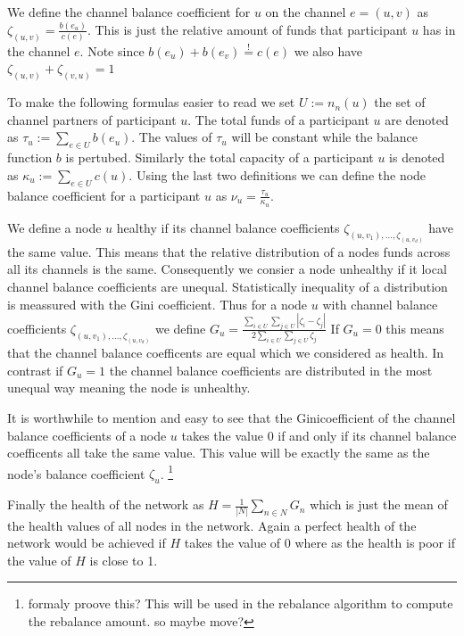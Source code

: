 \documentclass[a4paper]{paper}
\begin{document}
We define the channel balance coefficient for $u$ on the channel $e=(u,v)$ as  $\zeta_{(u,v)} = \frac{b(e_u)}{c(e)}$.
This is just the relative amount of funds that participant $u$ has in the channel $e$.
Note since $b(e_u)+b(e_v)\stackrel{!}{=}c(e)$ we also have $\zeta_{(u,v)} + \zeta_{(v,u)}=1$

To make the following formulas easier to read we set $U:=n_n(u)$ the set of channel partners of participant $u$.
The total funds of a participant $u$ are denoted as $\tau_u:=\displaystyle{\sum_{e\in U}b(e_u)}$.
The values of $\tau_u$ will be constant while the balance function $b$ is pertubed.
Similarly the total capacity of a participant $u$ is denoted as $\kappa_u:=\displaystyle{\sum_{e\in U}c(u)}$.
Using the last two definitions we can define the node balance coefficient for a participant $u$ as $\nu_u = \frac{\tau_u}{\kappa_u}$.

We define a node $u$ healthy if its channel balance coefficients $\zeta_{(u,v_1),\dots,\zeta_{(u,v_d)}}$ have the same value.
This means that the relative distribution of a nodes funds across all its channels is the same.
Consequently we consier a node unhealthy if it local channel balance coefficients are unequal.
Statistically inequality of a distribution is meassured with the Gini coefficient.
Thus for a node $u$ with channel balance coefficients $\zeta_{(u,v_1),\dots,\zeta_{(u,v_d)}}$ we define $G_u = \frac{\displaystyle{\sum_{i\in U} \sum_{j \in U}} | \zeta_i - \zeta_j |}{2 \displaystyle{\sum_{i \in U} \sum_{j \in U} \zeta_j}}$
If $G_u = 0$ this means that the channel balance coefficents are equal which we considered as health.
In contrast if $G_u = 1$ the channel balance coefficients are distributed in the most unequal way meaning the node is unhealthy.

It is worthwhile to mention and easy to see that the Ginicoefficient of the channel balance coefficients of a node $u$ takes the value $0$ if and only if its channel balance coefficents all take the same value.
This value will be exactly the same as the node's balance coefficient $\zeta_u$. \footnote{formaly proove this? This will be used in the rebalance algorithm to compute the rebalance amount. so maybe move? }

Finally the health of the network as $H = \displaystyle{\frac{1}{|N|}\sum_{n\in N}G_n}$ which is just the mean of the health values of all nodes in the network.
Again a perfect health of the network would be achieved if $H$ takes the value of $0$ where as the health is poor if the value of $H$ is close to 1.
\end{document}

